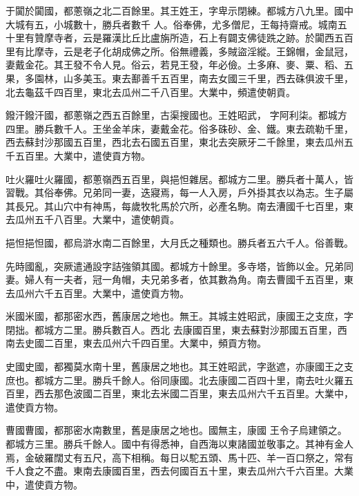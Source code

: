 \begin{pinyinscope}
 于闐於闐國，都蔥嶺之北二百餘里。其王姓王，字卑示閉練。都城方八九里。國中大城有五，小城數十，勝兵者數千
 人。俗奉佛，尤多僧尼，王每持齋戒。城南五十里有贊摩寺者，云是羅漢比丘比盧旃所造，石上有闢支佛徒跣之跡。於闐西五百里有比摩寺，云是老子化胡成佛之所。俗無禮義，多賊盜淫縱。王錦帽，金鼠冠，妻戴金花。其王發不令人見。俗云，若見王發，年必儉。土多麻、麥、粟、稻、五果，多園林，山多美玉。東去鄯善千五百里，南去女國三千里，西去硃俱波千里，北去龜茲千四百里，東北去瓜州二千八百里。大業中，頻遣使朝貢。



 鏺汗鏺汗國，都蔥嶺之西五百餘里，古渠搜國也。王姓昭武，
 字阿利柒。都城方四里。勝兵數千人。王坐金羊床，妻戴金花。俗多硃砂、金、鐵。東去疏勒千里，西去蘇封沙那國五百里，西北去石國五百里，東北去突厥牙二千餘里，東去瓜州五千五百里。大業中，遣使貢方物。



 吐火羅吐火羅國，都蔥嶺西五百里，與挹怛雜居。都城方二里。勝兵者十萬人，皆習戰。其俗奉佛。兄弟同一妻，迭寢焉，每一人入房，戶外掛其衣以為志。生子屬其長兄。其山穴中有神馬，每歲牧牝馬於穴所，必產名駒。南去漕國千七百里，東去瓜州五千八百里。大業中，遣使朝貢。



 挹怛挹怛國，都烏滸水南二百餘里，大月氏之種類也。勝兵者五六千人。俗善戰。



 先時國亂，突厥遣通設字詰強領其國。都城方十餘里。多寺塔，皆飾以金。兄弟同妻。婦人有一夫者，冠一角帽，夫兄弟多者，依其數為角。南去曹國千五百里，東去瓜州六千五百里。大業中，遣使貢方物。



 米國米國，都那密水西，舊康居之地也。無王。其城主姓昭武，康國王之支庶，字閉拙。都城方二里。勝兵數百人。西北
 去康國百里，東去蘇對沙那國五百里，西南去史國二百里，東去瓜州六千四百里。大業中，頻貢方物。



 史國史國，都獨莫水南十里，舊康居之地也。其王姓昭武，字逖遮，亦康國王之支庶也。都城方二里。勝兵千餘人。俗同康國。北去康國二百四十里，南去吐火羅五百里，西去那色波國二百里，東北去米國二百里，東去瓜州六千五百里。大業中，遣使貢方物。



 曹國曹國，都那密水南數里，舊是康居之地也。國無主，康國
 王令子烏建領之。都城方三里。勝兵千餘人。國中有得悉神，自西海以東諸國並敬事之。其神有金人焉，金破羅闊丈有五尺，高下相稱。每日以駝五頭、馬十匹、羊一百口祭之，常有千人食之不盡。東南去康國百里，西去何國百五十里，東去瓜州六千六百里。大業中，遣使貢方物。




\end{pinyinscope}
